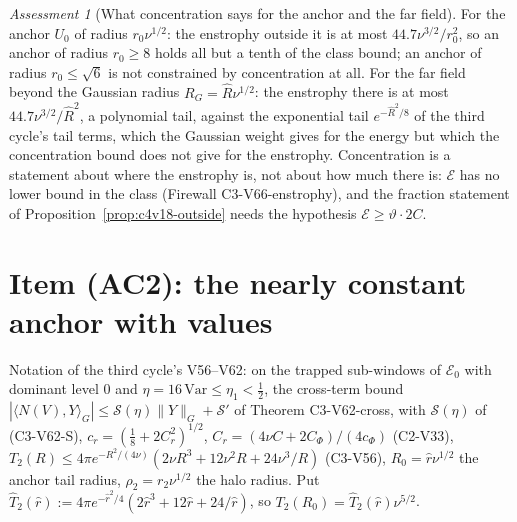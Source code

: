 \documentclass[11pt]{article}
\theoremstyle{plain}
\theoremstyle{definition}
\theoremstyle{remark}
\newtheorem{assessment}[theorem]{Assessment}
\begin{document}
\begin{assessment}[What concentration says for the anchor and the far field]
\label{ass:c4v18-reading-concentration}
For the anchor \(U_0\) of radius \(r_0\nu^{1/2}\): the enstrophy outside it is at
most \(44.7\nu^{3/2}/r_0^2\), so an anchor of radius \(r_0\ge8\) holds all but a
tenth of the class bound; an anchor of radius \(r_0\le\sqrt6\) is not
constrained by concentration at all.  For the far field beyond the
Gaussian radius \(R_G=\hat R\nu^{1/2}\): the enstrophy there is at most \(44.7\nu^{3/2}/\hat R^2\),
a polynomial tail, against the exponential tail \(e^{-\hat R^2/8}\) of the
third cycle's tail terms, which the Gaussian weight gives for the
energy but which the concentration bound does not give for the
enstrophy.  Concentration is a statement about where the enstrophy
is, not about how much there is: \(\mathcal E\) has no lower bound in the class
(Firewall C3-V66-enstrophy), and the fraction statement of
Proposition~\ref{prop:c4v18-outside} needs the hypothesis \(\mathcal E\ge\vartheta\cdot2C\).
\end{assessment}

\section{Item (AC2): the nearly constant anchor with values}
\label{sec:c4v18-nearly-constant}

Notation of the third cycle's V56--V62: on the trapped sub-windows of
\(\mathcal E_0\) with dominant level \(0\) and \(\eta=16\,\mathrm{Var}\le\eta_1<\frac12\), the cross-term
bound \(|\langle N(V),Y\rangle_G|\le\mathcal S(\eta)\|Y\|_G+\mathcal S'\) of Theorem C3-V62-cross, with
\(\mathcal S(\eta)\) of (C3-V62-S), \(c_r=(\frac18+2C_r^2)^{1/2}\), \(C_r=(4\nu C+2C_\Phi)/(4c_\Phi)\) (C2-V33),
\(T_2(R)\le4\pi e^{-R^2/(4\nu)}(2\nu R^3+12\nu^2R+24\nu^3/R)\) (C3-V56), \(R_0=\hat r\nu^{1/2}\) the anchor tail
radius, \(\rho_2=r_2\nu^{1/2}\) the halo radius.  Put
\(\widehat T_2(\hat r):=4\pi e^{-\hat r^2/4}(2\hat r^3+12\hat r+24/\hat r)\), so \(T_2(R_0)=\widehat T_2(\hat r)\nu^{5/2}\).
\end{document}
